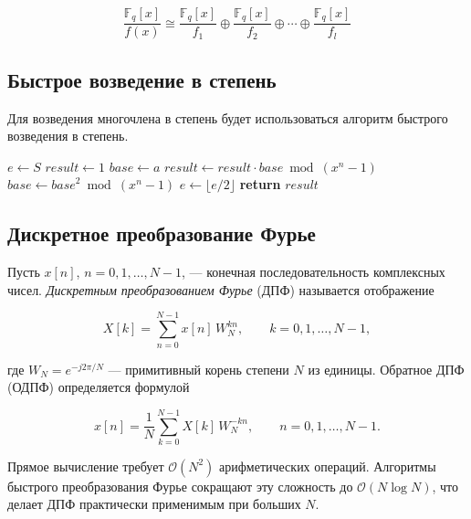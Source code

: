 \documentclass[14pt]{mmcs_article}
\theoremstyle{break}
\begin{document}
\begin{equation}
    \frac{\mathbb{F}_q[x]}{f(x)} \cong \frac{\mathbb{F}_q[x]}{f_1} \oplus \frac{\mathbb{F}_q[x]}{f_2} \oplus \cdots \oplus \frac{\mathbb{F}_q[x]}{f_l}
\end{equation}

\subsection{Быстрое возведение в степень}

Для возведения многочлена в степень будет использоваться алгоритм быстрого возведения в степень.

\begin{algorithm}[!h]
\caption{Быстрое возведение в степень}
\begin{algorithmic}[1]
\State $e \leftarrow S$
\State $\mathit{result} \leftarrow 1$
\State $\mathit{base} \leftarrow a$
        \State $\mathit{result} \leftarrow \mathit{result} \cdot \mathit{base} \bmod (x^n - 1)$
    \EndIf
    \State $\mathit{base} \leftarrow \mathit{base}^2 \bmod (x^n - 1)$
    \State $e \leftarrow \lfloor e / 2 \rfloor$
\EndWhile
\State \textbf{return} $\mathit{result}$
\end{algorithmic}
\end{algorithm}

\subsection{Дискретное преобразование Фурье}
\label{dpf}

Пусть $x[n]$, $n = 0, 1, \ldots, N-1$, — конечная последовательность
комплексных чисел. \emph{Дискретным преобразованием Фурье} (ДПФ) называется
отображение

\begin{equation}
    X[k] = \sum_{n=0}^{N-1} x[n]\, W_N^{kn}, \qquad k = 0, 1, \ldots, N-1,
    \label{eq:dft}
\end{equation}

\noindent где $W_N = e^{-j2\pi/N}$ — примитивный корень степени $N$ из
единицы. Обратное ДПФ (ОДПФ) определяется формулой

\begin{equation}
    x[n] = \frac{1}{N} \sum_{k=0}^{N-1} X[k]\, W_N^{-kn}, \qquad
    n = 0, 1, \ldots, N-1.
    \label{eq:idft}
\end{equation}

Прямое вычисление требует $\mathcal{O}(N^2)$ арифметических операций. Алгоритмы быстрого преобразования Фурье сокращают эту сложность до $\mathcal{O}(N \log N)$, что делает ДПФ практически применимым при больших $N$.
\end{document}
